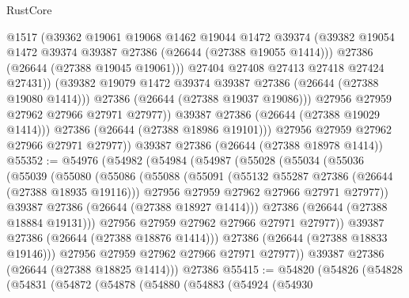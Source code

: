 \begin{lexlean}{RustCore}
\begin{coremodule}
                      @1517
                      (@39362
                        @19061
                        @19068
                        @1462
                        @19044
                        @1472
                        @39374
                        (@39382 @19054 @1472 @39374 @39387 @27386 (@26644 (@27388 @19055 @1414)))
                        @27386
                        (@26644 (@27388 @19045 @19061)))
                      @27404
                      @27408
                      @27413
                      @27418
                      @27424
                      @27431))
                  (@39382 @19079 @1472 @39374 @39387 @27386 (@26644 (@27388 @19080 @1414)))
                  @27386
                  (@26644 (@27388 @19037 @19086)))
                @27956
                @27959
                @27962
                @27966
                @27971
                @27977))
            @39387
            @27386
            (@26644 (@27388 @19029 @1414)))
          @27386
          (@26644 (@27388 @18986 @19101)))
        @27956
        @27959
        @27962
        @27966
        @27971
        @27977))
    @39387
    @27386
    (@26644 (@27388 @18978 @1414))
@55352 := @54976
    (@54982
      (@54984
        (@54987
          (@55028
            (@55034
              (@55036
                (@55039
                  (@55080
                    (@55086
                      (@55088
                        (@55091
                          (@55132 @55287 @27386 (@26644 (@27388 @18935 @19116)))
                          @27956
                          @27959
                          @27962
                          @27966
                          @27971
                          @27977))
                      @39387
                      @27386
                      (@26644 (@27388 @18927 @1414)))
                    @27386
                    (@26644 (@27388 @18884 @19131)))
                  @27956
                  @27959
                  @27962
                  @27966
                  @27971
                  @27977))
              @39387
              @27386
              (@26644 (@27388 @18876 @1414)))
            @27386
            (@26644 (@27388 @18833 @19146)))
          @27956
          @27959
          @27962
          @27966
          @27971
          @27977))
      @39387
      @27386
      (@26644 (@27388 @18825 @1414)))
    @27386
@55415 := @54820
    (@54826
      (@54828
        (@54831
          (@54872
            (@54878
              (@54880
                (@54883
                  (@54924
                    (@54930

\end{coremodule}
\end{lexlean}
